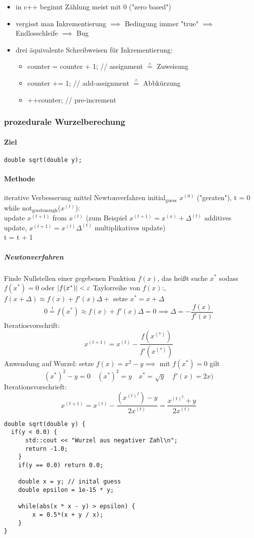 \documentclass[a4paper]{scrartcl}
\newcommand{\estimates}{\overset{\scriptscriptstyle\wedge}{=}}%
\DeclarePairedDelimiter\abs{\lvert}{\rvert}%
\begin{document}
\begin{itemize}
\item in c++ beginnt Zählung meist mit $0$ ("zero based")
\item vergisst man Inkrementierung $\implies$ Bedingung immer "true" $\implies$ Endlosschleife $\implies$ Bug
\item drei äquivalente Schreibweisen für Inkrementierung:
\begin{itemize}
\item counter = counter + 1; // assignment $\estimates$ Zuweisung
\item counter += 1;          // add-assignment $\estimates$ Abbkürzung
\item ++counter;             // pre-increment
\end{itemize}
\end{itemize}
\subsubsection{prozedurale Wurzelberechung}
\label{sec-7-2-5}
\paragraph{Ziel}
\label{sec-7-2-5-1}
\begin{verbatim}
double sqrt(double y);
\end{verbatim}
\paragraph{Methode}
\label{sec-7-2-5-2}
iterative Verbesserung mittel Newtonverfahren
initial$_{\text{guess}}$ $x^{(0)}$ ("geraten"), t = 0 \\
     while not$_{\text{good}}$$_{\text{enough}}$($x^{(t)}$): \\
         update $x^{(t + 1)}$ from $x^{(t)}$ (zum Beispiel $x^{(t + 1)} = x^{(x)} + \Delta^{(t)}$ additives update, $x^{(t + 1)} = x^{(t)}\Delta^{(t)}$ multiplikatives update) \\
         t = t + 1 \\
\subparagraph{Newtonverfahren}
\label{sec-7-2-5-2-1}
Finde Nullstellen einer gegebenen Funktion $f(x)$, das heißt suche $x^\ast$ sodass $f(x^\ast) = 0$ oder $\abs{f(x^\ast)} < \varepsilon$
Taylorreihe von $f(x)$:, $f(x + \Delta) \approx f(x) + f'(x)\Delta +$ setze $x^\ast = x + \Delta$
\[0 \overset{!}{=} f(x^\ast) \approx f(x) + f'(x)\Delta = 0 \implies \Delta = - \frac{f(x)}{f'(x)}\]
Iteratiosvorschrift:
\[x^{(t + 1)} = x^{(t)} - \frac{f(x^{(\ast)})}{f'(x^{(\ast)})}\]
Anwendung auf Wurzel: setze $f(x) = x^2 - y \implies$ mit $f(x^\ast) = 0$ gilt
\[(x^\ast)^2 -y = 0 \quad (x^\ast)^2 = y \quad x^\ast = \sqrt{y}\quad f'(x) = 2x)\]
Iterationsvorschrieft:
\[x^{(t + 1)} = x^{(t)} - \frac{(x^{(t)^2}) - y}{2x^{(t)}} = \frac{x^{(t)^2} + y}{2x^{(t)}}\]
\begin{verbatim}
double sqrt(double y) {
  if(y < 0.0) {
	  std::cout << "Wurzel aus negativer Zahl\n";
	  return -1.0;
	}
	if(y == 0.0) return 0.0;

	double x = y; // inital guess
	double epsilon = 1e-15 * y;

	while(abs(x * x - y) > epsilon) {
		x = 0.5*(x + y / x);
	}
}
\end{verbatim}
\end{document}
